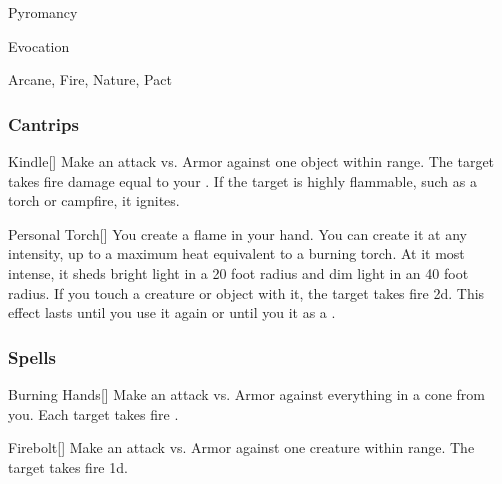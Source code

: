 \newpage
\begin{spellsection}{Pyromancy}

\begin{spellheader}
\end{spellheader}


 Evocation

 Arcane, Fire, Nature, Pact

\subsubsection{Cantrips}


\begin{apability}{Kindle}[]
Make an attack vs. Armor against one object within \rngclose range.
\hit The target takes fire damage equal to your .
If the target is highly flammable, such as a torch or campfire, it ignites.
\end{apability}


\begin{apability}{Personal Torch}[]
You create a flame in your hand.
You can create it at any intensity, up to a maximum heat equivalent to a burning torch.
At it most intense, it sheds bright light in a 20 foot radius and dim light in an 40 foot radius.
If you touch a creature or object with it, the target takes fire  \minus2d.
This effect lasts until you use it again or until you  it as a .
\end{apability}

\end{spellsection}


\subsubsection{Spells}


\lowercase{\hypertarget{spell:Burning Hands}{}}\label{spell:Burning Hands}
\begin{freeability}[\nth{1}]{\hypertarget{spell:Burning Hands}{Burning Hands}}[]
Make an attack vs. Armor against everything in a \areamed cone from you.
\hit Each target takes fire .
\end{freeability}
\vspace{0.25em}



\lowercase{\hypertarget{spell:Firebolt}{}}\label{spell:Firebolt}
\begin{freeability}[\nth{1}]{\hypertarget{spell:Firebolt}{Firebolt}}[]
Make an attack vs. Armor against one creature within \rngmed range.
\hit The target takes fire  \plus1d.
\end{freeability}
\vspace{0.25em}



